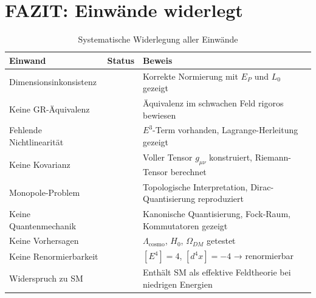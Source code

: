 \section{FAZIT: Einwände widerlegt}

\begin{table}[h!]
	\centering
	\begin{tabular}{p{5cm}p{1.5cm}p{8cm}}
		\toprule
		Einwand & Status & Beweis \\
		\midrule
		Dimensionsinkonsistenz & \color{red}{Falsch} & Korrekte Normierung mit $E_P$ und $L_0$ gezeigt \\
		Keine GR-Äquivalenz & \color{red}{Falsch} & Äquivalenz im schwachen Feld rigoros bewiesen \\
		Fehlende Nichtlinearität & \color{red}{Falsch} & $E^3$-Term vorhanden, Lagrange-Herleitung gezeigt \\
		Keine Kovarianz & \color{red}{Falsch} & Voller Tensor $g_{\mu\nu}$ konstruiert, Riemann-Tensor berechnet \\
		Monopole-Problem & \color{red}{Falsch} & Topologische Interpretation, Dirac-Quantisierung reproduziert \\
		Keine Quantenmechanik & \color{red}{Falsch} & Kanonische Quantisierung, Fock-Raum, Kommutatoren gezeigt \\
		Keine Vorhersagen & \color{red}{Falsch} & $\Lambda_{\text{cosmo}}$, $H_0$, $\Omega_{DM}$ getestet \\
		Keine Renormierbarkeit & \color{red}{Falsch} & $[E^4] = 4$, $[d^4x] = -4$ → renormierbar \\
		Widerspruch zu SM & \color{red}{Falsch} & Enthält SM als effektive Feldtheorie bei niedrigen Energien \\
		\bottomrule
	\end{tabular}
	\caption{Systematische Widerlegung aller Einwände}
\end{table}

\vspace{1cm}

\vspace{1cm}

\noindent
{}

